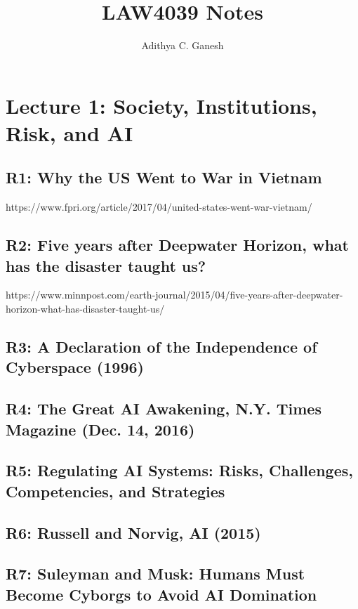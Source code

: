 \documentclass{article}
\title{LAW4039 Notes}
\author{Adithya C. Ganesh}
\begin{document}
\maketitle

\tableofcontents

\section{Lecture 1: Society, Institutions, Risk, and AI}

\subsection{R1: Why the US Went to War in Vietnam}

https://www.fpri.org/article/2017/04/united-states-went-war-vietnam/

\subsection{R2: Five years after Deepwater Horizon, what has the disaster taught us?}

https://www.minnpost.com/earth-journal/2015/04/five-years-after-deepwater-horizon-what-has-disaster-taught-us/

\subsection{R3: A Declaration of the Independence of Cyberspace (1996)}

\subsection{R4: The Great AI Awakening, N.Y. Times Magazine (Dec. 14, 2016)}

\subsection{R5: Regulating AI Systems: Risks, Challenges, Competencies, and Strategies}

\subsection{R6: Russell and Norvig, AI (2015)}

\subsection{R7: Suleyman and Musk: Humans Must Become Cyborgs to Avoid AI Domination}
\end{document}
